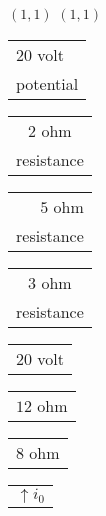 \documentclass{book}
\begin{document}
{\small $(1,1)$}%
\stopmpxshipout
\mpxshipout%
{\small $(1,1)$}%
\stopmpxshipout
\mpxshipout%
{\small \renewcommand{\arraystretch}{.9}
                \circuitfont\begin{tabular}{@{}l}
                   $20$ volt \\
                   potential
	        \end{tabular}}%
\stopmpxshipout
\mpxshipout%
{\small \renewcommand{\arraystretch}{.9}
                \circuitfont\begin{tabular}[t]{@{}c}
                   $2$ ohm \\
                   resistance
	        \end{tabular}}%
\stopmpxshipout
\mpxshipout%
{\small \renewcommand{\arraystretch}{.9}
                \circuitfont\begin{tabular}[t]{@{}r}
                   $5$ ohm \\
                   resistance
	        \end{tabular}}%
\stopmpxshipout
\mpxshipout%
{\small \renewcommand{\arraystretch}{.9}
                \circuitfont\begin{tabular}[b]{@{}c}
                   $3$ ohm \\
                   resistance
	        \end{tabular}}%
\stopmpxshipout
\mpxshipout%
{\small \renewcommand{\arraystretch}{.9}
                \circuitfont\begin{tabular}{@{}l}
                   $20$ volt 
	        \end{tabular}}%
\stopmpxshipout
\mpxshipout%
{\small \renewcommand{\arraystretch}{.9}
                \circuitfont\begin{tabular}{@{}r@{}}
                   $12$ ohm 
	        \end{tabular}}%
\stopmpxshipout
\mpxshipout%
{\small \renewcommand{\arraystretch}{.9}
                \circuitfont\begin{tabular}{@{}l@{}}
                   $8$ ohm 
	        \end{tabular}}%
\stopmpxshipout
\mpxshipout%
{\small \renewcommand{\arraystretch}{.9}
              \circuitfont\begin{tabular}{@{}l}
	        $\uparrow i_0$ 
	      \end{tabular}}%
\stopmpxshipout
\mpxshipout%
\end{document}
